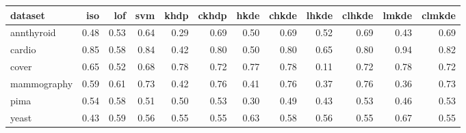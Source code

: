 \begin{table}[ht]
\centering
\begin{tabular}{lrrrrrrrrrrr}
  \hline
dataset & iso & lof & svm & khdp & ckhdp & hkde & chkde & lhkde & clhkde & lmkde & clmkde \\ 
  \hline
annthyroid & 0.48 & 0.53 & 0.64 & 0.29 & 0.69 & 0.50 & 0.69 & 0.52 & 0.69 & 0.43 & 0.69 \\ 
  cardio & 0.85 & 0.58 & 0.84 & 0.42 & 0.80 & 0.50 & 0.80 & 0.65 & 0.80 & 0.94 & 0.82 \\ 
  cover & 0.65 & 0.52 & 0.68 & 0.78 & 0.72 & 0.77 & 0.78 & 0.11 & 0.72 & 0.78 & 0.72 \\ 
  mammography & 0.59 & 0.61 & 0.73 & 0.42 & 0.76 & 0.41 & 0.76 & 0.37 & 0.76 & 0.36 & 0.73 \\ 
  pima & 0.54 & 0.58 & 0.51 & 0.50 & 0.53 & 0.30 & 0.49 & 0.43 & 0.53 & 0.46 & 0.53 \\ 
  yeast & 0.43 & 0.59 & 0.56 & 0.55 & 0.55 & 0.63 & 0.58 & 0.56 & 0.55 & 0.67 & 0.55 \\ 
   \hline
\end{tabular}
\end{table}
